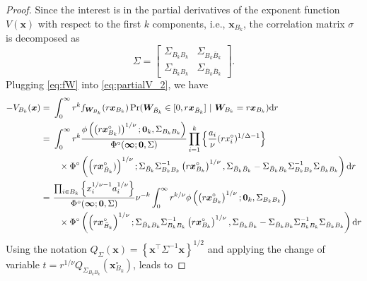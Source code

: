 \documentclass[12pt]{article}
\begin{document}
\begin{proof}
Since the interest is in the partial derivatives of the exponent function $V(\bm x)$ with respect to the first $k$ components, i.e.,  $\bm x_{B_k}$, the correlation matrix $\sigma$ is decomposed as
$$\Sigma = \begin{bmatrix}
 \Sigma_{B_k B_k} &  \Sigma_{B_k \bar{B}_k} \\
  \Sigma_{\bar{B}_k B_k} &  \Sigma_{\bar{B}_k \bar{B}_k}	
 \end{bmatrix}.
$$
Plugging \eqref{eq:fW} into \eqref{eq:partialV_2}, we have
%
\begin{align*}
 -V_{B_k}(\bm x) =&\ \int_0^\infty r^k f_{\bm W_{B_k}}(r \bm x_{B_k})  \Pr(\bm W_{\bar{B}_k} \in [0, r \bm x_{\bar{B}_k} ]\ | \ \bm W_{B_k} = r \bm x_{B_k} )\text dr \\
=&\ \int_0^\infty r^k \frac{\phi\left( \left( r \bm x_{B_k}^\circ) \right)^{1/\nu}; \bm 0_{k}, \Sigma_{B_k B_k}\right)}{\Phi^\circ(\bm \infty;\bm 0, \Sigma)} 
\prod_{i=1}^k \left\{ \frac{a_i}{\nu}(r x_i^\circ)^{1/\Delta-1} \right\} \\
&\quad \times \Phi^\circ \left( \left(r \bm x_{\bar{B}_k}^\circ)\right)^{1/\nu};
\Sigma_{\bar{B}_k}\Sigma_{B_k B_k}^{-1} \left(r \bm x_{B_k}^\circ\right)^{1/\nu},\Sigma_{\bar{B}_k\bar{B}_k}-\Sigma_{\bar{B}_k B_k}\Sigma_{B_k B_k}^{-1}\Sigma_{\bar{B}_k B_k} \right)  \text dr \\
=&\ \frac{\prod_{i\in B_k} \left\{ x_i^{1/\nu-1}a_i^{1/\nu}\right\}}{\Phi^\circ(\bm \infty;\bm 0, \Sigma)} \nu^{-k} \int_0^\infty r^{k/\nu} \phi\left( \left( r \bm x_{B_k}^\circ\right)^{1/\nu}; \bm 0_k, \Sigma_{B_k B_k}\right) \\
&\quad \times \Phi^\circ \left( \left(r \bm x_{\bar{B}_k}^\circ \right)^{1/\nu};
\Sigma_{\bar{B}_k B_k}\Sigma_{B_k B_k}^{-1} \left(r \bm x_{B_k}^\circ\right)^{1/\nu},\Sigma_{\bar{B}_k \bar{B}_k}-\Sigma_{\bar{B}_k B_k}\Sigma_{B_k B_k}^{-1}\Sigma_{\bar{B}_k B_k}\right) \text dr\\
\end{align*} 
%
Using the notation $Q_\Sigma \left( \bm x \right) = \left\{ \bm x^\top \Sigma^{-1} \bm x\right\}^{1/2}$ and applying the change of variable $t=r^{1/\nu}Q_{\Sigma_{B_k B_k}}(\bm x_{B_k}^\circ)$, leads to 


\end{proof}
\end{document}
